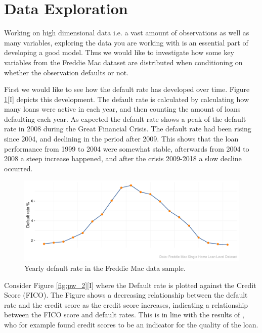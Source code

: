 \section{Data Exploration}
Working on high dimensional data i.e. a vast amount of observations as well as many variables, exploring the data you are working with is an essential part of developing a good model. Thus we would like to investigate how some key variables from the Freddie Mac dataset are distributed when conditioning on whether the observation defaults or not.  

First we would like to see how the default rate has developed over time. Figure \ref{fig:pw_1}[I] depicts this development. The default rate is calculated by calculating how many loans were active in each year, and then counting the amount of loans defaulting each year. As expected the default rate shows a peak of the default rate in 2008 during the Great Financial Crisis. The default rate had been rising since 2004, and declining in the period after 2009. This shows that the loan performance from 1999 to 2004 were somewhat stable, afterwards from 2004 to 2008 a steep increase happened, and after the crisis 2009-2018 a slow decline occurred. 


\begin{figure}[H]
    \centering
    \includegraphics[width = \textwidth]{Figures/pw_1.pdf}
    \caption{Yearly default rate in the Freddie Mac data sample.}
    \label{fig:pw_1}
\end{figure}

Consider Figure \ref{fig:pw_2}[I] where the Default rate is plotted against the Credit Score (FICO). The Figure shows a decreasing relationship between the default rate and the credit score as the credit score increases, indicating a relationship between the FICO score and default rates. This is in line with the results of \cite{Dannis_Pennington_2005},  who for example found credit scores to be an indicator for the quality of the loan. 

